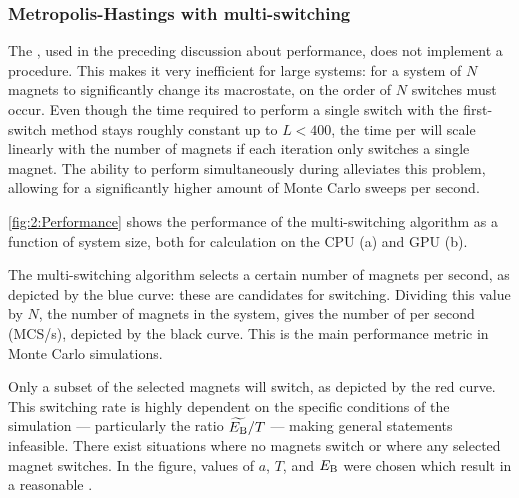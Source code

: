 \subsubsection{Metropolis-Hastings with multi-switching}
The , used in the preceding discussion about performance, does not implement a  procedure.
This makes it very inefficient for large systems: for a system of $N$ magnets to significantly change its macrostate, on the order of $N$ switches must occur.
Even though the time required to perform a single switch with the first-switch method stays roughly constant up to $L<400$, the time per  will scale linearly with the number of magnets if each iteration only switches a single magnet.
The ability to perform  simultaneously during  alleviates this problem, allowing for a significantly higher amount of Monte Carlo sweeps per second. \par
\cref{fig:2:Performance} shows the performance of the multi-switching algorithm as a function of system size, both for calculation on the CPU (a) and GPU (b).

\vspace{-1em}

The multi-switching algorithm selects a certain number of magnets per second, as depicted by the blue curve: these are candidates for switching.
Dividing this value by $N$, the number of magnets in the system, gives the number of  per second (MCS/s), depicted by the black curve.
This is the main performance metric in Monte Carlo simulations. \par
Only a subset of the selected magnets will switch, as depicted by the red curve.
This switching rate is highly dependent on the specific conditions of the simulation --- particularly the ratio $\widetilde{E_\mathrm{B}}/T$ --- making general statements infeasible.
There exist situations where no magnets switch or where any selected magnet switches.
In the figure, values of $a$, $T$, and $E_\mathrm{B}$ were chosen which result in a reasonable . \\\par

